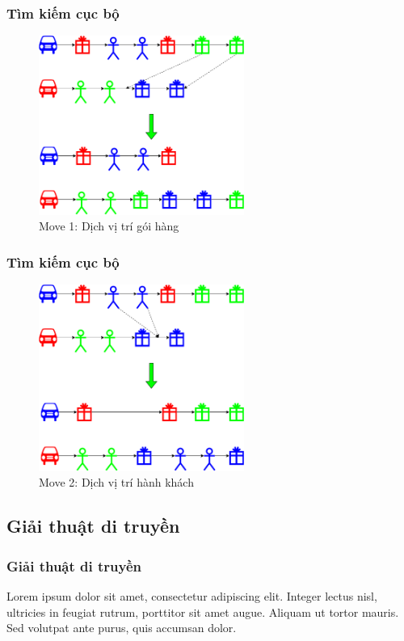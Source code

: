 \documentclass{beamer}
\begin{document}
	\begin{frame}
		\frametitle{Tìm kiếm cục bộ}
		\begin{figure}
			\centering
			\caption{Move 1: Dịch vị trí gói hàng}
			\includegraphics[width=0.6\textwidth]{images/cbls-good.png}
		\end{figure}
	\end{frame}

	\begin{frame}
		\frametitle{Tìm kiếm cục bộ}
		\begin{figure}
			\centering
			\caption{Move 2: Dịch vị trí hành khách}
			\includegraphics[width=0.6\textwidth]{images/cbls-people.png}
		\end{figure}
	\end{frame}

	\subsection{Giải thuật di truyền}
	\begin{frame}
	\frametitle{Giải thuật di truyền}
	Lorem ipsum dolor sit amet, consectetur adipiscing elit. Integer lectus nisl, ultricies in feugiat rutrum, porttitor sit amet augue. Aliquam ut tortor mauris. Sed volutpat ante purus, quis accumsan dolor.
\end{frame}
	
\end{document}

